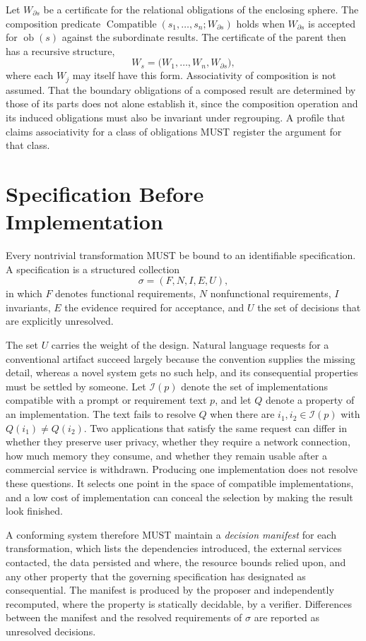 \documentclass[11pt]{article}
\theoremstyle{remark}
\begin{document}
Let $W_{\partial s}$ be a certificate for the relational obligations of the enclosing sphere. The composition predicate $\operatorname{Compatible}(s_1,\dots,s_n;W_{\partial s})$ holds when $W_{\partial s}$ is accepted for $\operatorname{ob}(s)$ against the subordinate results. The certificate of the parent then has a recursive structure,
\[
W_s=\bigl(W_1,\dots,W_n,W_{\partial s}\bigr),
\]
where each $W_j$ may itself have this form. Associativity of composition is not assumed. That the boundary obligations of a composed result are determined by those of its parts does not alone establish it, since the composition operation and its induced obligations must also be invariant under regrouping. A profile that claims associativity for a class of obligations MUST register the argument for that class.

\section{Specification Before Implementation}\label{sec:spec}

Every nontrivial transformation MUST be bound to an identifiable specification. A specification is a structured collection
\[
\sigma=(F,N,I,E,U),
\]
in which $F$ denotes functional requirements, $N$ nonfunctional requirements, $I$ invariants, $E$ the evidence required for acceptance, and $U$ the set of decisions that are explicitly unresolved.

The set $U$ carries the weight of the design. Natural language requests for a conventional artifact succeed largely because the convention supplies the missing detail, whereas a novel system gets no such help, and its consequential properties must be settled by someone. Let $\mathcal I(p)$ denote the set of implementations compatible with a prompt or requirement text $p$, and let $Q$ denote a property of an implementation. The text fails to resolve $Q$ when there are $i_1,i_2\in\mathcal I(p)$ with $Q(i_1)\neq Q(i_2)$. Two applications that satisfy the same request can differ in whether they preserve user privacy, whether they require a network connection, how much memory they consume, and whether they remain usable after a commercial service is withdrawn. Producing one implementation does not resolve these questions. It selects one point in the space of compatible implementations, and a low cost of implementation can conceal the selection by making the result look finished.

A conforming system therefore MUST maintain a \emph{decision manifest} for each transformation, which lists the dependencies introduced, the external services contacted, the data persisted and where, the resource bounds relied upon, and any other property that the governing specification has designated as consequential. The manifest is produced by the proposer and independently recomputed, where the property is statically decidable, by a verifier. Differences between the manifest and the resolved requirements of $\sigma$ are reported as unresolved decisions.
\end{document}
